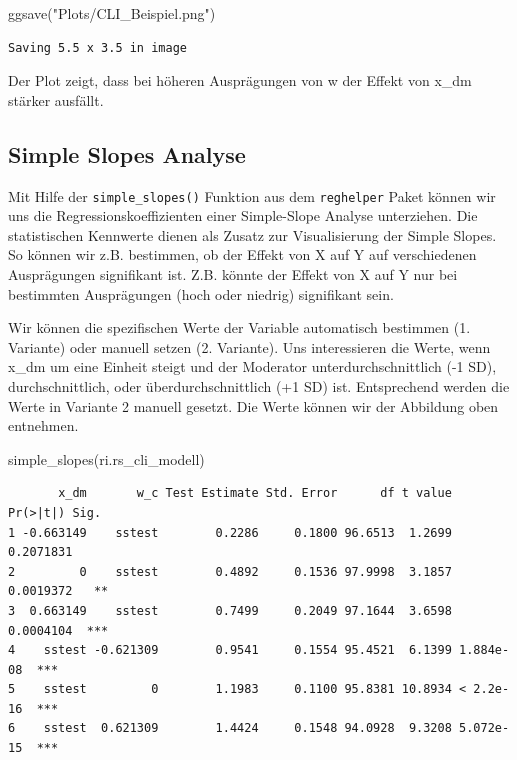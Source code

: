 \documentclass[
  letterpaper,
  DIV=11,
  numbers=noendperiod]{scrreprt}
\newenvironment{Shaded}{\begin{snugshade}}{\end{snugshade}}
\newcommand{\FunctionTok}[1]{\textcolor[rgb]{0.28,0.35,0.67}{#1}}
\newcommand{\NormalTok}[1]{\textcolor[rgb]{0.00,0.23,0.31}{#1}}
\newcommand{\StringTok}[1]{\textcolor[rgb]{0.13,0.47,0.30}{#1}}
\begin{document}
\begin{Shaded}
\begin{Highlighting}[]
\FunctionTok{ggsave}\NormalTok{(}\StringTok{"Plots/CLI\_Beispiel.png"}\NormalTok{)}
\end{Highlighting}
\end{Shaded}

\begin{verbatim}
Saving 5.5 x 3.5 in image
\end{verbatim}

Der Plot zeigt, dass bei höheren Ausprägungen von w der Effekt von x\_dm
stärker ausfällt.

\subsection{Simple Slopes Analyse}\label{simple-slopes-analyse}

Mit Hilfe der \texttt{simple\_slopes()} Funktion aus dem
\texttt{reghelper} Paket können wir uns die Regressionskoeffizienten
einer Simple-Slope Analyse unterziehen. Die statistischen Kennwerte
dienen als Zusatz zur Visualisierung der Simple Slopes. So können wir
z.B. bestimmen, ob der Effekt von X auf Y auf verschiedenen Ausprägungen
signifikant ist. Z.B. könnte der Effekt von X auf Y nur bei bestimmten
Ausprägungen (hoch oder niedrig) signifikant sein.

Wir können die spezifischen Werte der Variable automatisch bestimmen (1.
Variante) oder manuell setzen (2. Variante). Uns interessieren die
Werte, wenn x\_dm um eine Einheit steigt und der Moderator
unterdurchschnittlich (-1 SD), durchschnittlich, oder
überdurchschnittlich (+1 SD) ist. Entsprechend werden die Werte in
Variante 2 manuell gesetzt. Die Werte können wir der Abbildung oben
entnehmen.

\begin{Shaded}
\begin{Highlighting}[]
\FunctionTok{simple\_slopes}\NormalTok{(ri.rs\_cli\_modell)}
\end{Highlighting}
\end{Shaded}

\begin{verbatim}
       x_dm       w_c Test Estimate Std. Error      df t value  Pr(>|t|) Sig.
1 -0.663149    sstest        0.2286     0.1800 96.6513  1.2699 0.2071831     
2         0    sstest        0.4892     0.1536 97.9998  3.1857 0.0019372   **
3  0.663149    sstest        0.7499     0.2049 97.1644  3.6598 0.0004104  ***
4    sstest -0.621309        0.9541     0.1554 95.4521  6.1399 1.884e-08  ***
5    sstest         0        1.1983     0.1100 95.8381 10.8934 < 2.2e-16  ***
6    sstest  0.621309        1.4424     0.1548 94.0928  9.3208 5.072e-15  ***
\end{verbatim}
\end{document}
